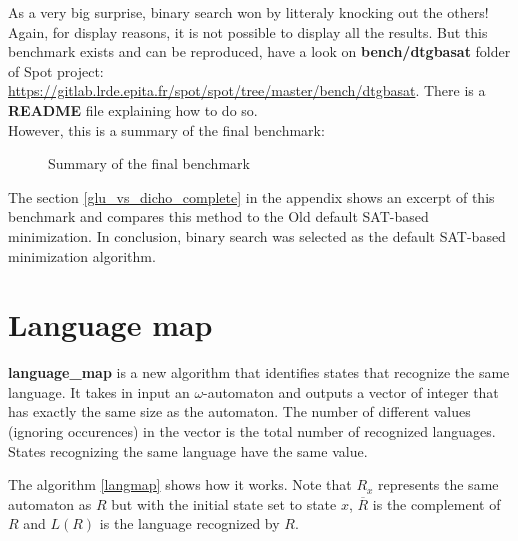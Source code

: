 \noindent As a very big surprise, binary search won by litteraly knocking out the others! Again, for display
reasons, it is not possible to display all the results. But this benchmark exists and can be
reproduced, have a look on \textbf{bench/dtgbasat} folder of Spot project:
\url{https://gitlab.lrde.epita.fr/spot/spot/tree/master/bench/dtgbasat}. There is a \textbf{README} file
explaining how to do so.\\

However, this is a summary of the final benchmark:
\begin{figure}[H]
 \centering
 
 \caption{Summary of the final benchmark}
 \label{fig:final_bench_resume}
\end{figure}

\noindent The section \ref{glu_vs_dicho_complete} in the appendix shows an excerpt of this benchmark and
compares this method to the Old default SAT-based minimization. In conclusion, binary search was selected
as the default SAT-based minimization algorithm.

\section{Language map}
\textbf{language\_map} is a new algorithm that identifies states that recognize the same language.
It takes in input an $\omega$-automaton and outputs a vector of integer that has exactly the same
size as the automaton. The number of different values (ignoring occurences) in the vector is the
total number of recognized languages. States recognizing the same language have the same value.\\
\newcommand{\stcomp}[1]{\overline{#1}}
\begin{algorithm}[h]
 \caption{}
 \label{langmap}
 \begin{algorithmic}[1]
     \If{$\textit{L}(R_i) \cap \textit{L}(\stcomp{R_j}) \neq \emptyset \land \textit{L}(\stcomp{R_i}) \cap \textit{L}(R_j) \neq \emptyset$}
     \EndIf
    \EndFor
   \EndFor
  \EndProcedure
 \end{algorithmic}
\end{algorithm}
\noindent The algorithm \ref{langmap} shows how it works. Note that $R_x$ represents the same automaton as $R$ but
with the initial state set to state $x$, $\stcomp{R}$ is the complement of $R$ and $\textit{L}(R)$
is the language recognized by $R$.\\


